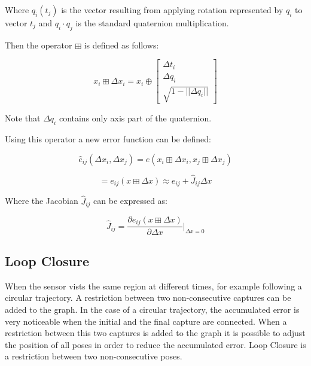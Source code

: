 Where $q_i(t_j)$ is the vector resulting from applying rotation represented by $q_i$ to vector $t_j$ and 
$q_i \cdot q_j$ is the standard quaternion multiplication.

Then the operator $\boxplus$ is defined as follows:

$$
x_i \boxplus \Delta x_i = x_i \oplus \begin{bmatrix} \Delta t_i \\ \Delta q_i \\ \sqrt{1-||\Delta q_i||}  \end{bmatrix}
$$

Note that $\Delta q_i$ contains only axis part of the quaternion.

Using this operator a new error function can be defined:

$$
\hat{e}_{ij}(\Delta x_i,\Delta x_j) = e(x_i \boxplus \Delta x_i,x_j \boxplus \Delta x_j)
$$

$$
= e_{ij}(x \boxplus \Delta x) \approx e_{ij} + \hat{J}_{ij} \Delta x
$$

Where the Jacobian $\hat{J}_{ij}$ can be expressed as:

$$
\hat{J}_{ij} = \frac{\partial{e_{ij}(x \boxplus \Delta x)}}{\partial{\Delta x}} \bigg|_{\Delta x=0}
$$

\subsection{Loop Closure}

When the sensor vists the same region at different times, for example following 
a circular trajectory. A restriction between two non-consecutive captures can be 
added to the graph. In the case of a circular trajectory, the accumulated error 
is very noticeable when the initial and the final capture are connected. When a  
restriction between this two captures is added to the graph it is possible to 
adjust the position of all poses in order to reduce the accumulated error. Loop Closure is 
a restriction between two non-consecutive poses.


